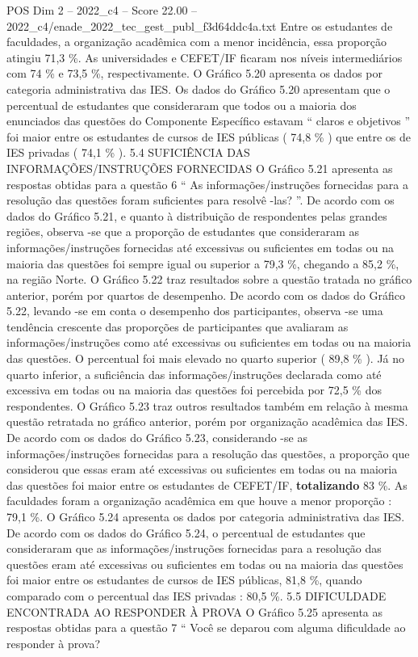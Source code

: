 \begin{textsample}{POS Dim 2 – 2022\_c4 – Score 22.00 – 2022\_c4/enade\_2022\_tec\_gest\_publ\_f3d64ddc4a.txt}
Entre os estudantes de faculdades, a organização acadêmica com a menor incidência, essa proporção atingiu 71,3 \%.
As universidades e CEFET/IF ficaram nos níveis intermediários com 74 \% e 73,5 \%, respectivamente.
O Gráfico 5.20 apresenta os dados por categoria administrativa das IES.
Os dados do Gráfico 5.20 apresentam que o percentual de estudantes que consideraram que todos ou a maioria dos enunciados das questões do Componente Específico estavam “ claros e objetivos ” foi maior entre os estudantes de cursos de IES públicas ( 74,8 \% ) que entre os de IES privadas ( 74,1 \% ). 5.4 SUFICIÊNCIA DAS INFORMAÇÕES/INSTRUÇÕES FORNECIDAS O Gráfico 5.21 apresenta as respostas obtidas para a questão 6 “ As informações/instruções fornecidas para a resolução das questões foram suficientes para resolvê -las? ”.
De acordo com os dados do Gráfico 5.21, e quanto à distribuição de respondentes pelas grandes regiões, observa -se que a proporção de estudantes que consideraram as informações/instruções fornecidas até excessivas ou suficientes em todas ou na maioria das questões foi sempre igual ou superior a 79,3 \%, chegando a 85,2 \%, na região Norte.
O Gráfico 5.22 traz resultados sobre a questão tratada no gráfico anterior, porém por quartos de desempenho.
De acordo com os dados do Gráfico 5.22, levando -se em conta o desempenho dos participantes, observa -se uma tendência crescente das proporções de participantes que avaliaram as informações/instruções como até excessivas ou suficientes em todas ou na maioria das questões.
O percentual foi mais elevado no quarto superior ( 89,8 \% ).
Já no quarto inferior, a suficiência das informações/instruções declarada como até excessiva em todas ou na maioria das questões foi percebida por 72,5 \% dos respondentes.
O Gráfico 5.23 traz outros resultados também em relação à mesma questão retratada no gráfico anterior, porém por organização acadêmica das IES.
De acordo com os dados do Gráfico 5.23, considerando -se as informações/instruções fornecidas para a resolução das questões, a proporção que considerou que essas eram até excessivas ou suficientes em todas ou na maioria das questões foi maior entre os estudantes de CEFET/IF, \textbf{totalizando} 83 \%.
As faculdades foram a organização acadêmica em que houve a menor proporção : 79,1 \%.
O Gráfico 5.24 apresenta os dados por categoria administrativa das IES.
De acordo com os dados do Gráfico 5.24, o percentual de estudantes que consideraram que as informações/instruções fornecidas para a resolução das questões eram até excessivas ou suficientes em todas ou na maioria das questões foi maior entre os estudantes de cursos de IES públicas, 81,8 \%, quando comparado com o percentual das IES privadas : 80,5 \%. 5.5 DIFICULDADE ENCONTRADA AO RESPONDER À PROVA O Gráfico 5.25 apresenta as respostas obtidas para a questão 7 “ Você se deparou com alguma dificuldade ao responder à prova?

\end{textsample}
